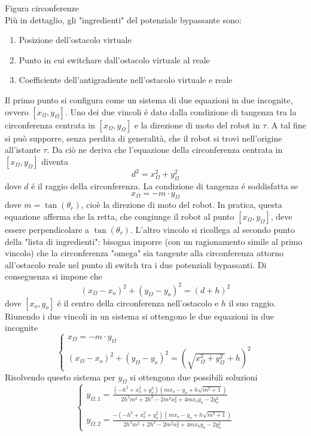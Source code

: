 \documentclass[14pt,a4paper]{extarticle}
\begin{document}
Figura circonferenze\\

Più in dettaglio, gli "ingredienti" del potenziale bypassante sono:
\begin{enumerate}
\item Posizione dell'ostacolo virtuale
\item Punto in cui switchare dall'ostacolo virtuale al reale
\item Coefficiente dell'antigradiente nell'ostacolo virtuale e reale
\end{enumerate}
Il primo punto si configura come un sistema di due equazioni in due incognite, ovvero \([x_{\Omega}, y_{\Omega}]\). Uno dei due vincoli é dato dalla condizione di tangenza tra la circonferenza centrata in  \([x_{\Omega}, y_{\Omega}]\) e la direzione di moto del robot in \(\tau\). A tal fine si può supporre, senza perdita di generalità, che il robot si trovi nell'origine all'istante \(\tau\). Da ciò ne deriva che l'equazione della circonferenza centrata in \([x_{\Omega}, y_{\Omega}]\) diventa \[d^2=x_{\Omega}^2+y_{\Omega}^2\] dove \(d\) é il raggio della circonferenza. La condizione di tangenza é soddisfatta se \[x_{\Omega} = -m\cdot  y_{\Omega}\] dove \(m = \tan(\theta_r)\), cioè la direzione di moto del robot. In pratica, questa equazione afferma che la retta, che congiunge il robot al punto \([x_{\Omega}, y_{\Omega}]\), deve essere perpendicolare a \(\tan(\theta_r)\). L'altro vincolo si ricollega al secondo punto della "lista di ingredienti": bisogna imporre (con un ragionamento simile al primo vincolo) che la circonferenza "omega" sia tangente alla circonferenza attorno all'ostacolo reale nel punto di switch tra i due potenziali bypassanti. Di conseguenza si impone che \[(x_{\Omega} - x_o)^2 + (y_{\Omega} - y_o)^2 = (d+h)^2\] dove \([x_o, y_o]\) é il centro della circonferenza nell'ostacolo e \(h\) il suo raggio. Riunendo i due vincoli in un sistema si ottengono le due equazioni in due incognite
\begin{equation}
\begin{cases}
x_{\Omega} = -m\cdot  y_{\Omega} \\
(x_{\Omega} - x_o)^2 + (y_{\Omega} - y_o)^2 = (\sqrt{x_{\Omega}^2+y_{\Omega}^2}+h)^2
\end{cases}
\end{equation}
Risolvendo questo sistema per \(y_{\Omega}\) si ottengono due possibili soluzioni
\begin{equation}
\begin{cases}
y_{\Omega,1}=\frac{(-h^2 + x_o^2 + y_o^2)(m x_o - y_o + h\sqrt{m^2+1})}{2h^2m^2 + 2h^2 - 2m^2x_o^2 + 4mx_oy_o - 2y_o^2} \\\\
y_{\Omega,2}=\frac{-(-h^2 + x_o^2 + y_o^2)(m x_o - y_o + h\sqrt{m^2+1})}{2h^2m^2 + 2h^2 - 2m^2x_o^2 + 4mx_oy_o - 2y_o^2}
\end{cases}
\end{equation}
\end{document}

